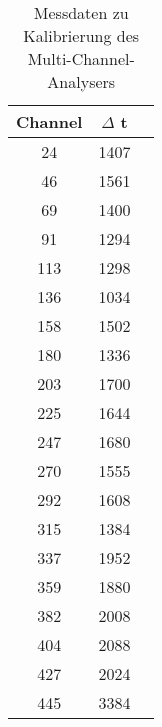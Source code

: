\begin{table}[h!]
  \centering
  \caption{Messdaten zu Kalibrierung des Multi-Channel-Analysers}
  \label{tab:kalibrierung}
  \begin{tabular}{c c c}
    \toprule
      Channel & $\Delta$ t \\
      \midrule
         24   &   1407   \\
         46   &   1561   \\
         69   &   1400   \\
         91   &   1294   \\
        113   &   1298   \\
        136   &   1034   \\
        158   &   1502   \\
        180   &   1336   \\
        203   &   1700   \\
        225   &   1644   \\
        247   &   1680   \\
        270   &   1555   \\
        292   &   1608   \\
        315   &   1384   \\
        337   &   1952   \\
        359   &   1880   \\
        382   &   2008   \\
        404   &   2088   \\
        427   &   2024   \\
        445   &   3384   \\

    \bottomrule
  \end{tabular}
\end{table}

%
